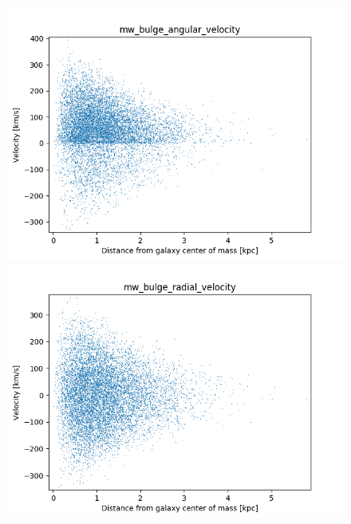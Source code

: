 \documentclass[a4paper,12pt, english]{article}
\begin{document}
\begin{figure}[!h]
\centering
\begin{minipage}{0.4\textwidth}
  \centering
\includegraphics[width=1\textwidth]{VelocityDistr/mw_bulge_angular_velocity.png}
\end{minipage}
\begin{minipage}{0.4\textwidth}
  \centering
\includegraphics[width=1\textwidth]{VelocityDistr/mw_bulge_radial_velocity.png}
\end{minipage}
\begin{minipage}{0.4\textwidth}
  \centering

\end{minipage}
\end{figure}
\end{document}
